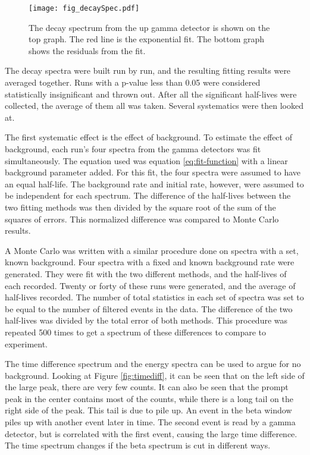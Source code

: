 \begin{figure}[!htb]
\centerline{\texttt{[image: fig\_decaySpec.pdf]}}
\caption{The decay spectrum from the up gamma detector is shown on the top graph.
	The red line is the exponential fit. 
	The bottom graph shows the residuals from the fit. 
	}
\label{fig:60secdecay}
\end{figure}


The decay spectra were built run by run, and the resulting fitting results were averaged together. 
Runs with a p-value less than 0.05 were considered statistically insignificant and thrown out.
After all the significant half-lives were collected, the average of them all was taken.
Several systematics were then looked at.

The first systematic effect is the effect of background.
To estimate the effect of background, each run's four spectra from the gamma detectors  was fit simultaneously. 
The equation used was equation \ref{eq:fit-function} with a linear background parameter added.
For this fit, the four spectra were assumed to have an equal half-life.
The background rate and initial rate, however, were assumed to be independent for each spectrum.
The difference of the half-lives between the two fitting methods was then divided by the square root of the sum of the squares of errors.
This normalized difference was compared to Monte Carlo results.

A Monte Carlo was written with a similar procedure done on spectra with a set, known background. 
Four spectra with a fixed and known background rate were generated.
They were fit with the two different methods, and the half-lives of each recorded.
Twenty or forty of these runs were generated, and the average of half-lives recorded.
The number of total statistics in each set of spectra was set to be equal to the number of filtered events in the data.
The difference of the two half-lives was divided by the total error of both methods.
This procedure was repeated 500 times to get a spectrum of these differences to compare to experiment. 

The time difference spectrum and the energy spectra can be used to argue for no background. 
Looking at Figure \ref{fig:timediff}, it can be seen that on the left side of the large peak, there are very few counts.
It can also be seen that the prompt peak in the center contains most of the counts, while there is a long tail on the right side of the peak.
This tail is due to pile up. 
An event in the beta window piles up with another event later in time. 
The second event is read by a gamma detector, but is correlated with the first event, causing the large time difference.
The time spectrum changes if the beta spectrum is cut in different ways.

